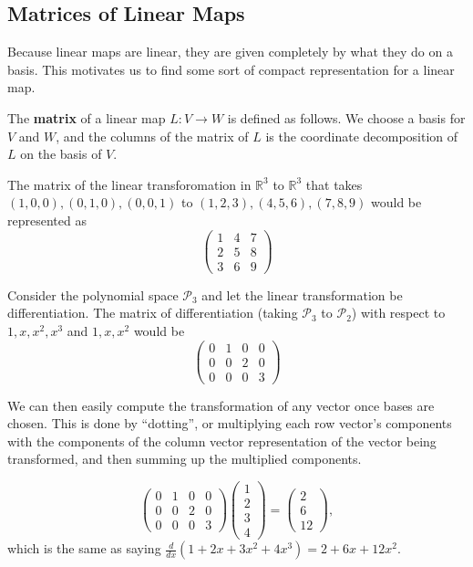 \subsection{Matrices of Linear Maps}
Because linear maps are linear, they are given completely by what they
do on a basis. This motivates us to find some sort of compact
representation for a linear map.

\begin{df}
The \textbf{matrix} of a linear map $L : V \rightarrow W$ is defined as
follows. We choose a basis for $V$ and $W$, and the columns of the
matrix of $L$ is the coordinate decomposition of $L$ on the basis of
$V$.
\end{df}

\begin{ex}
The matrix of the linear transforomation in $\mathbb{R}^3$ to
$\mathbb{R}^3$ that takes $(1, 0, 0), (0, 1, 0), (0, 0, 1)$ to $(1, 2,
3),  (4, 5, 6), (7, 8, 9)$ would be represented as
\[ \begin{pmatrix}
1 & 4 & 7 \\
2 & 5 & 8 \\
3 & 6 & 9
\end{pmatrix} \]
\end{ex}

\begin{ex}
Consider the polynomial space $\mathcal{P}_3$ and let the linear
transformation be differentiation. The matrix of differentiation (taking
$\mathcal{P}_3$ to $\mathcal{P}_2$) with respect to $1, x, x^2, x^3$ and
$1, x, x^2$ would be
\[ \begin{pmatrix}
0 & 1 & 0 & 0 \\
0 & 0 & 2 & 0 \\
0 & 0 & 0 & 3
\end{pmatrix} \]
\end{ex}

We can then easily compute the transformation of any vector once bases
are chosen. This is done by ``dotting'', or multiplying each row
vector's components with the components of the column vector
representation of the vector being transformed, and then summing up the
multiplied components.

\begin{ex}
\[ \begin{pmatrix}
0 & 1 & 0 & 0 \\
0 & 0 & 2 & 0 \\
0 & 0 & 0 & 3
\end{pmatrix} \begin{pmatrix}
1 \\ 2 \\ 3 \\ 4
\end{pmatrix} = \begin{pmatrix}
2 \\ 6 \\ 12
\end{pmatrix}, \]
which is the same as saying $\frac{d}{dx}(1 + 2x + 3x^2 + 4x^3) = 2 + 6x
+ 12x^2$.
\end{ex}

